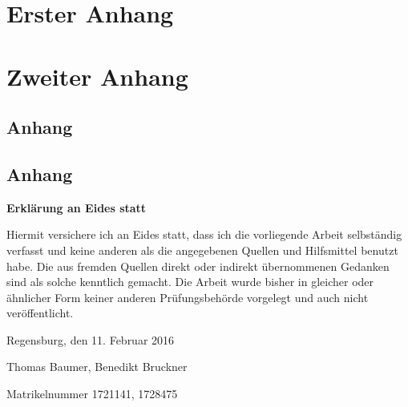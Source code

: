 \documentclass[11pt,a4paper,german,notitlepage]{report}
\newcommand{\authorname}{Thomas Baumer, Benedikt Bruckner}
\newcommand{\matrikelnr}{1721141, 1728475}
\newcommand{\abgabedatum}{11. Februar 2016}
\begin{document}
\newpage

{}
\appendix
\appendixpage


\chapter{Erster Anhang}
\label{chap:anhang_1}

\chapter{Zweiter Anhang}
\label{chap:anhang_2}

\section{Anhang}
\label{sec:anhang_2_1}

\section{Anhang}
\label{sec:anhang_2_2}

\clearpage

{}



\clearpage

%
%
%

\thispagestyle{empty}
\label{erklaerung}

\setlength{\parindent}{0em}

\textbf{\large{Erklärung an Eides statt}}

\vspace*{20pt}
Hiermit versichere ich an Eides statt, dass ich die vorliegende Arbeit selbständig verfasst und keine anderen als die angegebenen Quellen und Hilfsmittel benutzt habe. Die aus fremden Quellen direkt oder indirekt übernommenen Gedanken sind als solche kenntlich gemacht. Die Arbeit wurde bisher in gleicher oder ähnlicher Form keiner anderen Prüfungsbehörde vorgelegt und auch nicht veröffentlicht.

\vspace*{65pt}


Regensburg, den \abgabedatum

\vspace*{60pt}


\authorname

Matrikelnummer \matrikelnr
\end{document}
